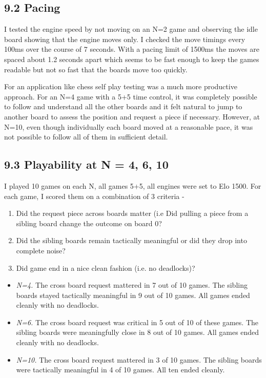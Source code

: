 \documentclass[11pt,a4paper]{article}
\begin{document}
\subsection*{9.2 Pacing}
I tested the engine speed by not moving on an N=2 game and observing the idle board showing that the engine moves only. I checked the move timings every 100ms over the course of 7 seconds. With a pacing limit of 1500ms the moves are spaced about 1.2 seconds apart which seems to be fast enough to keep the games readable but not so fast that the boards move too quickly.

For an application like chess self play testing was a much more productive approach. For an N=4 game with a 5+5 time control, it was completely possible to follow and understand all the other boards and it felt natural to jump to another board to assess the position and request a piece if necessary. However, at N=10, even though individually each board moved at a reasonable pace, it was not possible to follow all of them in sufficient detail.

\subsection*{9.3 Playability at N = 4, 6, 10}
I played 10 games on each N, all games 5+5, all engines were set to Elo 1500. For each game, I scored them on a combination of 3 criteria - 
\begin{enumerate}
    \item Did the request piece across boards matter  (i.e Did pulling a piece from a sibling board change the outcome on board 0? 
    \item Did the sibling boards remain tactically meaningful or did they drop into complete noise? 
    \item Did game end in a nice clean fashion (i.e. no deadlocks)?
\end{enumerate}

\begin{itemize}[leftmargin=*]
\item \textit{N=4.} The cross board request mattered in 7 out of 10 games. The sibling boards stayed tactically meaningful in 9 out of 10 games. All games ended cleanly with no deadlocks.
\item \textit{N=6.} The cross board request was critical in 5 out of 10 of these games. The sibling boards were meaningfully close in 8 out of 10 games. All games ended cleanly with no deadlocks.
\item \textit{N=10.} The cross board request mattered in 3 of 10 games. The sibling boards were tactically meaningful in 4 of 10 games. All ten ended cleanly.
\end{itemize}
\end{document}
